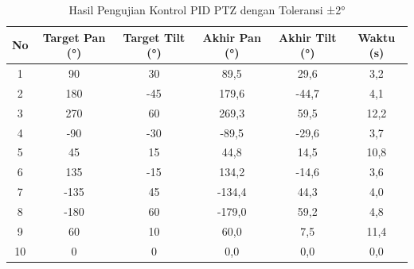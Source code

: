 \begin{table}[H]
	\centering
	\caption{Hasil Pengujian Kontrol PID PTZ dengan Toleransi ±2°}
	\label{tab:pengujian_ptz_dual}
	\begin{tabular}{|c|c|c|c|c|c|}
		\hline
		\textbf{No} & \textbf{Target Pan (°)} & \textbf{Target Tilt (°)} & \textbf{Akhir Pan (°)} & \textbf{Akhir Tilt (°)} & \textbf{Waktu (s)} \\
		\hline
		1           & 90                      & 30                       & 89{,}5                 & 29{,}6                  & 3{,}2              \\
		2           & 180                     & -45                      & 179{,}6                & -44{,}7                 & 4{,}1              \\
		3           & 270                     & 60                       & 269{,}3                & 59{,}5                  & 12{,}2             \\
		4           & -90                     & -30                      & -89{,}5                & -29{,}6                 & 3{,}7              \\
		5           & 45                      & 15                       & 44{,}8                 & 14{,}5                  & 10{,}8             \\
		6           & 135                     & -15                      & 134{,}2                & -14{,}6                 & 3{,}6              \\
		7           & -135                    & 45                       & -134{,}4               & 44{,}3                  & 4{,}0              \\
		8           & -180                    & 60                       & -179{,}0               & 59{,}2                  & 4{,}8              \\
		9           & 60                      & 10                       & 60{,}0                 & 7{,}5                   & 11{,}4             \\
		10          & 0                       & 0                        & 0{,}0                  & 0{,}0                   & 0{,}0              \\
		\hline
	\end{tabular}
\end{table}


